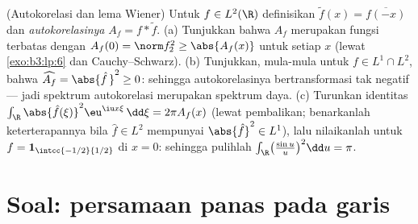 \begin{exercise}[$\star\star$]\label{exo:b3:fouriertransform:12}
(Autokorelasi dan lema Wiener) Untuk $f \in L^2(\R)$
definisikan $\tilde f(x) = \overline{f(-x)}$ dan
\emph{autokorelasinya} $A_f = f * \tilde f$.
(a) Tunjukkan bahwa $A_f$ merupakan fungsi  terbatas dengan
$A_f(0) = \norm f_2^2 \geq \abs{A_f(x)}$ untuk setiap $x$
(lewat \cref{exo:b3:lp:6} dan Cauchy--Schwarz).
(b) Tunjukkan, mula-mula untuk $f \in L^1\cap L^2$, bahwa
$\widehat{A_f} = \abs{\hat f\,}^2 \geq 0$: sehingga
autokorelasinya bertransformasi tak negatif --- jadi spektrum
autokorelasi merupakan spektrum daya.
(c) Turunkan identitas $\int_\R\abs{\hat
f(\xi)}^2\eu^{\iu x\xi}\,\dd\xi = 2\pi A_f(x)$ (lewat pembalikan;
benarkanlah keterterapannya bila $\hat f \in L^2$ mempunyai
$\abs{\hat f}^2 \in L^1$), lalu nilaikanlah untuk $f = \mathbf
1_{\intcc{-1/2}{1/2}}$ di $x = 0$: sehingga pulihlah
$\int_\R\bigl(\frac{\sin u}u\bigr)^2\dd u = \pi$.
\end{exercise}

\section{Soal: persamaan panas pada garis}

